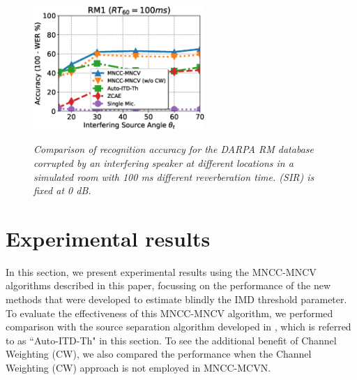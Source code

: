 \documentclass{article}
\begin{document}
%
\begin{figure}
       \begin{center}
         {\includegraphics[width=65mm]{../figures/plot_comparison_angle}}
       {\caption{\label{fig:PDCW_AUTO_IntLoc}
                \emph{Comparison of recognition accuracy for the DARPA RM database corrupted by an interfering speaker   at different locations in a simulated room with 100 {\it ms} different reverberation time. (SIR) is fixed at 0 dB. } 
	       }}
   \end{center}
   \vspace{-8mm}
\end{figure}
%
%
\section{Experimental results}
	\label{sec:experimentalResults}
In this section, we present experimental results using the MNCC-MNCV algorithms 
described in this paper, focussing on the performance of the new methods that
were developed to estimate blindly the IMD threshold parameter. To evaluate the
effectiveness of this MNCC-MNCV algorithm, we performed
comparison with the source separation algorithm developed in  \cite
{C_Kim_INTERSPEECH_2010_1}, which is referred to as 
``Auto-ITD-Th" in this section. To see the additional benefit of Channel
Weighting (CW), we also compared the performance
when the Channel Weighting (CW) approach is not employed in
MNCC-MCVN.
\end{document}
